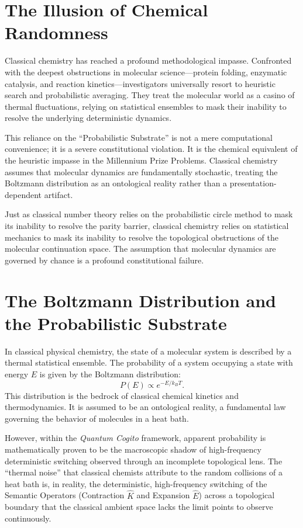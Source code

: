 \documentclass[11pt,openany]{extbook}
\theoremstyle{plain}
\theoremstyle{definition}
\begin{document}
\section{The Illusion of Chemical Randomness}
Classical chemistry has reached a profound methodological impasse. Confronted with the deepest obstructions in molecular science---protein folding, enzymatic catalysis, and reaction kinetics---investigators universally resort to heuristic search and probabilistic averaging. They treat the molecular world as a casino of thermal fluctuations, relying on statistical ensembles to mask their inability to resolve the underlying deterministic dynamics.

This reliance on the ``Probabilistic Substrate'' is not a mere computational convenience; it is a severe constitutional violation. It is the chemical equivalent of the heuristic impasse in the Millennium Prize Problems. Classical chemistry assumes that molecular dynamics are fundamentally stochastic, treating the Boltzmann distribution as an ontological reality rather than a presentation-dependent artifact.

Just as classical number theory relies on the probabilistic circle method to mask its inability to resolve the parity barrier, classical chemistry relies on statistical mechanics to mask its inability to resolve the topological obstructions of the molecular continuation space. The assumption that molecular dynamics are governed by chance is a profound constitutional failure.

\section{The Boltzmann Distribution and the Probabilistic Substrate}
In classical physical chemistry, the state of a molecular system is described by a thermal statistical ensemble. The probability of a system occupying a state with energy $E$ is given by the Boltzmann distribution:
\[
P(E) \propto e^{-E / k_B T}.
\]
This distribution is the bedrock of classical chemical kinetics and thermodynamics. It is assumed to be an ontological reality, a fundamental law governing the behavior of molecules in a heat bath.

However, within the \emph{Quantum Cogito} framework, apparent probability is mathematically proven to be the macroscopic shadow of high-frequency deterministic switching observed through an incomplete topological lens. The ``thermal noise'' that classical chemists attribute to the random collisions of a heat bath is, in reality, the deterministic, high-frequency switching of the Semantic Operators (Contraction $\hat{K}$ and Expansion $\hat{E}$) across a topological boundary that the classical ambient space lacks the limit points to observe continuously.
\end{document}
